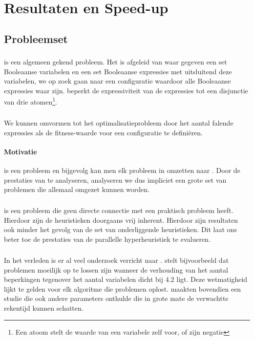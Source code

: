 \chapter{Resultaten en Speed-up}
\section{Probleemset}

\subsection{}

 is een algemeen gekend probleem. Het is afgeleid van  waar gegeven een set Booleaanse variabelen en een set Booleaanse expressies met uitsluitend deze variabelen, we op zoek gaan naar een configuratie waardoor alle Booleaanse expressies waar zijn.  beperkt de expressiviteit van de expressies tot een disjunctie van drie atomen\footnote{Een atoom stelt de waarde van een variabele zelf voor, of zijn negatie}.

\paragraph{}
We kunnen  omvormen tot het optimalisatieprobleem  door het aantal falende expressies als de fitness-waarde voor een configuratie te defini\"eren.

\subsubsection{Motivatie}

 is een  probleem en bijgevolg kan men elk probleem in  omzetten naar . Door de prestaties van  te analyseren, analyseren we dus impliciet een grote set van problemen die allemaal omgezet kunnen worden.

\paragraph{}
 is een probleem die geen directe connectie met een praktisch probleem heeft. Hierdoor zijn de heuristieken doorgaans vrij inherent. Hierdoor zijn resultaten ook minder het gevolg van de set van onderliggende heuristieken. Dit laat ons beter toe de prestaties van de parallelle hyperheuristiek te evalueren.

\paragraph{}
In het verleden is er al veel onderzoek verricht naar . \cite{satDifficult} stelt bijvoorbeeld dat  problemen moeilijk op te lossen zijn wanneer de verhouding van het aantal beperkingen tegenover het aantal variabelen dicht bij $4.2$ ligt. Deze wetmatigheid lijkt te gelden voor elk algoritme die  problemen oplost. \cite{satHardness} maakten bovendien een studie die ook andere parameters onthulde die in grote mate de verwachtte rekentijd kunnen schatten.


